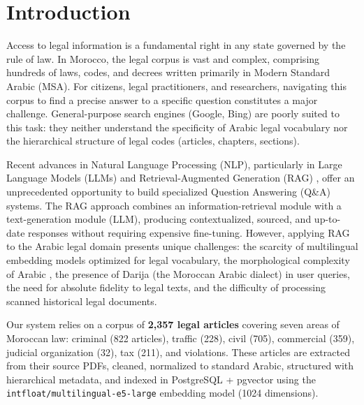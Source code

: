 \section{Introduction}
\label{sec:introduction}

Access to legal information is a fundamental right in any state governed by
the rule of law. In Morocco, the legal corpus is vast and complex, comprising
hundreds of laws, codes, and decrees written primarily in Modern Standard
Arabic (MSA). For citizens, legal practitioners, and researchers, navigating
this corpus to find a precise answer to a specific question constitutes a
major challenge. General-purpose search engines (Google, Bing) are poorly
suited to this task: they neither understand the specificity of Arabic legal
vocabulary nor the hierarchical structure of legal codes (articles, chapters,
sections).

Recent advances in Natural Language Processing (NLP), particularly in Large
Language Models (LLMs) and Retrieval-Augmented Generation (RAG)
\cite{lewis2020retrieval}, offer an unprecedented opportunity to build
specialized Question Answering (Q\&A) systems. The RAG approach combines an
information-retrieval module with a text-generation module (LLM), producing
contextualized, sourced, and up-to-date responses without requiring expensive
fine-tuning. However, applying RAG to the Arabic legal domain presents unique
challenges: the scarcity of multilingual embedding models optimized for legal
vocabulary, the morphological complexity of Arabic \cite{habash2010arabic},
the presence of Darija (the Moroccan Arabic dialect) in user queries, the
need for absolute fidelity to legal texts, and the difficulty of processing
scanned historical legal documents.

Our system relies on a corpus of \textbf{2{,}357 legal articles} covering
seven areas of Moroccan law: criminal (822 articles), traffic (228), civil
(705), commercial (359), judicial organization (32), tax (211), and
violations. These articles are extracted from their source PDFs, cleaned,
normalized to standard Arabic, structured with hierarchical metadata, and
indexed in PostgreSQL + pgvector using the
\texttt{intfloat/multilingual-e5-large} embedding model (1024 dimensions).

